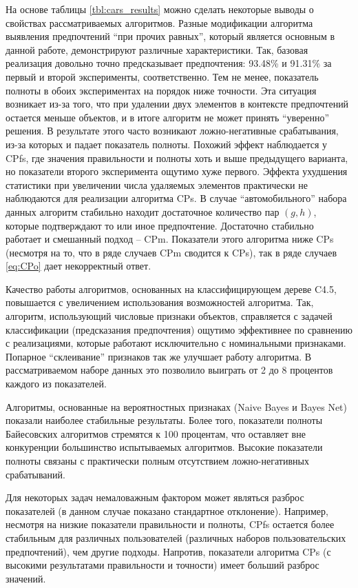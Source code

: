 	На основе таблицы \ref{tbl:cars_results} можно сделать некоторые выводы о свойствах рассматриваемых алгоритмов. Разные модификации алгоритма выявления предпочтений \enquote{при прочих равных}, который является основным в данной работе, демонстрируют различные характеристики. Так, базовая реализация довольно точно предсказывает предпочтения: 93.48\% и 91.31\% за первый и второй эксперименты, соответственно. Тем не менее, показатель полноты в обоих экспериментах на порядок ниже точности. Эта ситуация возникает из-за того, что при удалении двух элементов в контексте предпочтений остается меньше объектов, и в итоге алгоритм не может принять ``уверенно'' решения. В результате этого часто возникают ложно-негативные срабатывания, из-за которых и падает показатель полноты. Похожий эффект наблюдается у CPfs, где значения правильности и полноты хоть и выше предыдущего варианта, но показатели второго эксперимента ощутимо хуже первого. Эффекта ухудшения статистики при увеличении числа удаляемых элементов практически не наблюдаются для реализации алгоритма CPs. В случае ``автомобильного'' набора данных алгоритм стабильно находит достаточное количество пар $(g,h)$, которые подтверждают то или иное предпочтение. Достаточно стабильно работает и смешанный подход – CPm. Показатели этого алгоритма ниже CPs (несмотря на то, что в ряде случаев CPm сводится к CPs), так в ряде случаев \ref{eq:CPo} дает некорректный ответ.
	
	Качество работы алгоритмов, основанных на классифицирующем дереве C4.5, повышается с увеличением использования возможностей алгоритма. Так, алгоритм, использующий числовые признаки объектов, справляется с задачей классификации (предсказания предпочтения) ощутимо эффективнее по сравнению с реализациями, которые работают исключительно с номинальными признаками. Попарное ``склеивание'' признаков так же улучшает работу алгоритма. В рассматриваемом наборе данных это позволило выиграть от 2 до 8 процентов каждого из показателей.
	
	Алгоритмы, основанные на вероятностных признаках (Naive Bayes и Bayes Net) показали наиболее стабильные результаты. Более того, показатели полноты Байесовских алгоритмов стремятся к 100 процентам, что оставляет вне конкуренции большинство испытываемых алгоритмов. Высокие показатели полноты связаны с практически полным отсутствием ложно-негативных срабатываний.
	
	Для некоторых задач немаловажным фактором может являться разброс показателей (в данном случае показано стандартное отклонение). Например, несмотря на низкие показатели правильности и полноты, CPfs остается более стабильным для различных пользователей (различных наборов пользовательских предпочтений), чем другие подходы. Напротив, показатели алгоритма CPs (с высокими результатами правильности и точности) имеет больший разброс значений.
	
